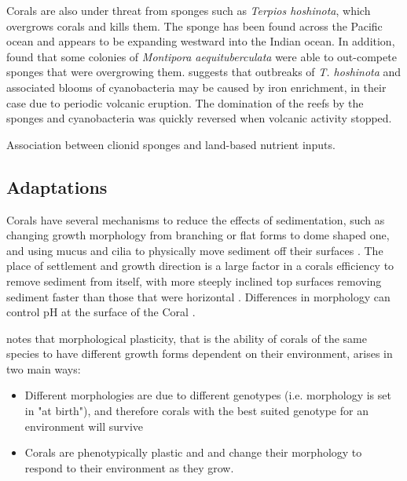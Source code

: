 \documentclass[11pt,a4paper]{article}
\begin{document}
Corals are also under threat from sponges \citep{Elliott2016} such as \textit{Terpios hoshinota}, which overgrows corals and kills them.
 The sponge has been found across the Pacific ocean and appears to be expanding westward into the Indian ocean. 
  In addition, \cite{Elliott2016} found that some colonies of \textit{Montipora aequituberculata} were able to out-compete sponges that were overgrowing them. 
  \cite{Schils2012} suggests that outbreaks of \textit{T. hoshinota} and associated blooms of cyanobacteria may be caused by iron enrichment, in their case due to periodic volcanic eruption. The domination of the reefs by the sponges and cyanobacteria was quickly reversed when volcanic activity stopped. 

\cite{WardPaige2005Sponge} Association between clionid sponges and land-based nutrient inputs.

\subsection{Adaptations}


Corals have several mechanisms to reduce the effects of sedimentation, such as changing growth morphology from branching or flat forms to dome shaped one, and using mucus and cilia to physically move sediment off their surfaces \citep{Logan1988, Stafford1992}.
 The place of settlement and growth direction is a large factor in a corals efficiency to remove sediment from itself, with more steeply inclined top surfaces removing sediment faster than those that were horizontal \citep{Logan1988}.
  Differences in morphology can control pH at the surface of the Coral \citep{Chan2016}.



\cite{Todd2008} notes that morphological plasticity, that is the ability of corals of the same species to have different growth forms dependent on their environment, arises in two main ways:
\begin{itemize}
\item Different morphologies are due to different genotypes (i.e. morphology is set in "at birth"), and therefore corals with the best suited genotype for an environment will survive \citep{Ayre1988}
\item  Corals are phenotypically plastic and and change their morphology to respond to their environment as they grow. \citep{Muko2000}
\end{itemize}
\end{document}
